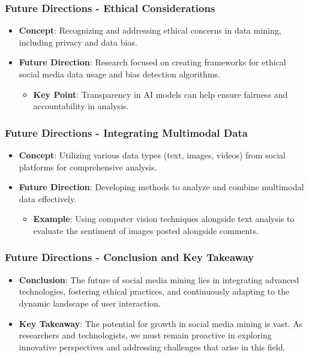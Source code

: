 \documentclass{beamer}
\begin{document}
\begin{frame}[fragile]
    \frametitle{Future Directions - Ethical Considerations}
    \begin{itemize}
        \item \textbf{Concept}: Recognizing and addressing ethical concerns in data mining, including privacy and data bias.
        \item \textbf{Future Direction}: Research focused on creating frameworks for ethical social media data usage and bias detection algorithms.
        \begin{itemize}
            \item \textbf{Key Point}: Transparency in AI models can help ensure fairness and accountability in analysis.
        \end{itemize}
    \end{itemize}
\end{frame}

\begin{frame}[fragile]
    \frametitle{Future Directions - Integrating Multimodal Data}
    \begin{itemize}
        \item \textbf{Concept}: Utilizing various data types (text, images, videos) from social platforms for comprehensive analysis.
        \item \textbf{Future Direction}: Developing methods to analyze and combine multimodal data effectively.
        \begin{itemize}
            \item \textbf{Example}: Using computer vision techniques alongside text analysis to evaluate the sentiment of images posted alongside comments.
        \end{itemize}
    \end{itemize}
\end{frame}

\begin{frame}[fragile]
    \frametitle{Future Directions - Conclusion and Key Takeaway}
    \begin{itemize}
        \item \textbf{Conclusion}: The future of social media mining lies in integrating advanced technologies, fostering ethical practices, and continuously adapting to the dynamic landscape of user interaction.
        \item \textbf{Key Takeaway}: The potential for growth in social media mining is vast. As researchers and technologists, we must remain proactive in exploring innovative perspectives and addressing challenges that arise in this field.
    \end{itemize}
\end{frame}
\end{document}
